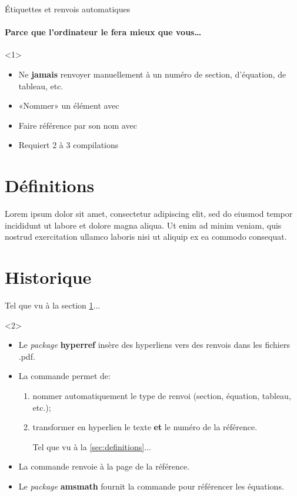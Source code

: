 \begin{frame}[fragile]{Étiquettes et renvois automatiques}
	\framesubtitle{Parce que l'ordinateur le fera mieux que vous\ldots}
	\begin{onlyenv}
		\begin{itemize}
			\item Ne \textbf{jamais} renvoyer manuellement à un numéro de section, d’équation, de tableau, etc.
			\item «Nommer» un élément avec 
			\item Faire référence par son nom avec 
			\item Requiert 2 à 3 compilations
		\end{itemize}
	
\begin{codesource}
	\section{Définitions}
		\label{sec:definitions}
	
		Lorem ipsum dolor sit amet, consectetur adipiscing elit, 
		sed do eiusmod tempor incididunt ut labore et dolore magna aliqua. 
		Ut enim ad minim veniam, quis nostrud exercitation ullamco laboris 
		nisi ut aliquip ex ea commodo consequat.
	
	\section{Historique}
		Tel que vu à la section \ref{sec:definitions}...
\end{codesource}
	\end{onlyenv}
	\begin{onlyenv}
		\begin{itemize}
			\item Le \emph{package} \textbf{hyperref} insère des hyperliens vers des renvois dans les fichiers .pdf.
			\item La commande  permet de:
				\begin{enumerate}
					\item nommer automatiquement le type de renvoi (section, équation, tableau, etc.);
					\item transformer en hyperlien le texte \textbf{et} le numéro de la référence.
\begin{codesource}
	Tel que vu à la \autoref{sec:definitions}...
\end{codesource}
				\end{enumerate}
			\item La commande  renvoie à la page de la référence.
			\item Le \emph{package} \textbf{amsmath} fournit la commande  pour
				référencer les équations.
		\end{itemize}
	\end{onlyenv}
\end{frame}